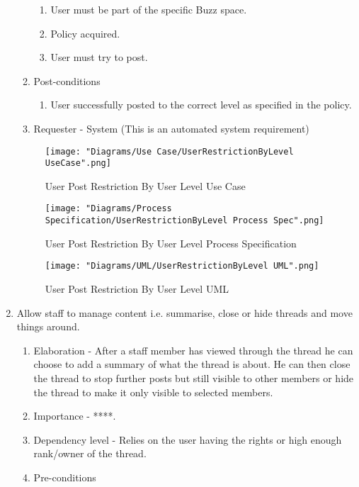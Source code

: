 \documentclass[12pt]{article}
\begin{document}
\begin{enumerate}
\begin{enumerate}
    \begin{enumerate}
    	\item User must be part of the specific Buzz space.
    	\item Policy acquired.
    	\item User must try to post.
    \end{enumerate}
        \item Post-conditions
    \begin{enumerate}
    	\item User successfully posted to the correct level as specified in the policy.
    \end{enumerate}
    \item Requester - System (This is an automated system requirement)
  \end{enumerate}
\begin{figure}[h]
	\centering
	\texttt{[image: "Diagrams/Use Case/UserRestrictionByLevel UseCase".png]}
	\caption{User Post Restriction By User Level Use Case}
\end{figure}
\begin{figure}[h]
	\centering
	\texttt{[image: "Diagrams/Process Specification/UserRestrictionByLevel Process Spec".png]}
	\caption{User Post Restriction By User Level Process Specification}
\end{figure}
\begin{figure}[h]
	\centering
	\texttt{[image: "Diagrams/UML/UserRestrictionByLevel UML".png]}
	\caption{User Post Restriction By User Level UML}
\end{figure}
\clearpage %
   \item  Allow staff to manage content i.e. summarise, close or hide threads and move things around.%
  \begin{enumerate}
    \item Elaboration - After a staff member has viewed through the thread he can choose to add a summary of what the thread is about. He can then close the thread to stop further posts but still visible to other members or hide the thread to make it only visible to selected members.
    \item Importance - ****.
    \item Dependency level - Relies on the user having the rights or high enough rank/owner of the thread.
    \item Pre-conditions
    \begin{enumerate}

\end{enumerate}
\end{enumerate}
\end{enumerate}
\end{document}
